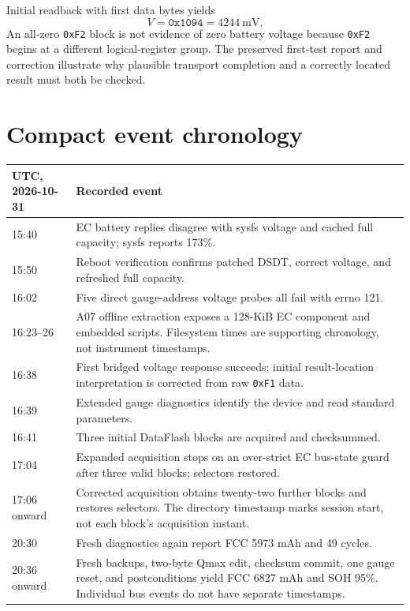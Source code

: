 \documentclass[11pt,a4paper]{article}
\newcommand{\hex}[1]{\texttt{0x#1}}
\newcommand{\code}[1]{\texttt{\detokenize{#1}}}
\begin{document}
Initial readback with first data bytes \code{94 10} yields
\begin{equation}
 V=\hex{1094}=4244\ \mathrm{mV}.
\end{equation}
An all-zero \hex{F2} block is not evidence of zero battery voltage because \hex{F2} begins at a different logical-register group. The preserved first-test report and correction illustrate why plausible transport completion and a correctly located result must both be checked.

\section{Compact event chronology}
\begin{longtable}{p{21mm}p{117mm}}
\toprule UTC, 2026-10-31 & Recorded event\\\midrule\endhead
15:40 & EC battery replies disagree with sysfs voltage and cached full capacity; sysfs reports 173\%.\\
15:50 & Reboot verification confirms patched DSDT, correct voltage, and refreshed full capacity.\\
16:02 & Five direct gauge-address voltage probes all fail with errno 121.\\
16:23--26 & A07 offline extraction exposes a 128-KiB EC component and embedded scripts. Filesystem times are supporting chronology, not instrument timestamps.\\
16:38 & First bridged voltage response succeeds; initial result-location interpretation is corrected from raw \hex{F1} data.\\
16:39 & Extended gauge diagnostics identify the device and read standard parameters.\\
16:41 & Three initial DataFlash blocks are acquired and checksummed.\\
17:04 & Expanded acquisition stops on an over-strict EC bus-state guard after three valid blocks; selectors restored.\\
17:06 onward & Corrected acquisition obtains twenty-two further blocks and restores selectors. The directory timestamp marks session start, not each block's acquisition instant.\\
20:30 & Fresh diagnostics again report FCC 5973 mAh and 49 cycles.\\
20:36 onward & Fresh backups, two-byte Qmax edit, checksum commit, one gauge reset, and postconditions yield FCC 6827 mAh and SOH 95\%. Individual bus events do not have separate timestamps.\\\bottomrule
\end{longtable}



\end{document}
